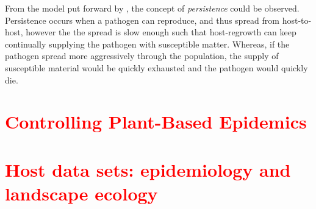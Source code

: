 From the model put forward by \cite{park2001invasion}, the concept of \textit{persistence} could be observed. Persistence occurs when a pathogen can reproduce, and thus spread from host-to-host, however the the spread is slow enough such that host-regrowth can keep continually supplying the pathogen with susceptible matter. Whereas, if the pathogen spread more aggressively through the population, the supply of susceptible material would be quickly exhausted and the pathogen would quickly die.


\section{\textcolor{red}{Controlling Plant-Based Epidemics}}

\blindtext


\section{\textcolor{red}{Host data sets: epidemiology and landscape ecology}}


